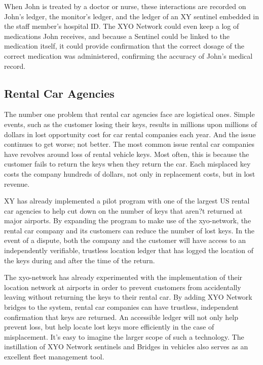\documentclass{article}
\begin{document}
When John is treated by a doctor or nurse, these interactions are recorded on John's ledger, the monitor's ledger, and the ledger of an XY \Gls{sentinel} embedded in the staff member's hospital ID. The XYO Network could even keep a log of medications John receives, and because a Sentinel could be linked to the medication itself, it could provide confirmation that the correct dosage of the correct medication was administered, confirming the accuracy of John's medical record.


\subsection{Rental Car Agencies}
The number one problem that rental car agencies face are logistical ones. Simple events, such as the customer losing their keys, results in millions upon millions of dollars in lost opportunity cost for car rental companies each year. And the issue continues to get worse; not better. The most common issue rental car companies have revolves around loss of rental vehicle keys. Most often, this is because the customer fails to return the keys when they return the car. Each misplaced key costs the company hundreds of dollars, not only in replacement costs, but in lost revenue.

XY has already implemented a pilot program with one of the largest US rental car agencies to help cut down on the number of keys that aren?t returned at major airports. By expanding the program to make use of the \Gls{xyo-network}, the rental car company and its customers can reduce the number of lost keys. In the event of a dispute, both the company and the customer will have access to an independently verifiable, trustless location ledger that has logged the location of the keys during and after the time of the return.

The \Gls{xyo-network} has already experimented with the implementation of their location network at airports in order to prevent customers from accidentally leaving without returning the keys to their rental car. By adding XYO Network \Glspl{bridge} to the system, rental car companies can have trustless, independent confirmation that keys are returned.  An accessible ledger will not only help prevent loss, but help locate lost keys more efficiently in the case of misplacement. It's easy to imagine the larger scope of such a technology. The instillation of XYO Network \Glspl{sentinel} and Bridges in vehicles also serves as an excellent fleet management tool.
\end{document}
